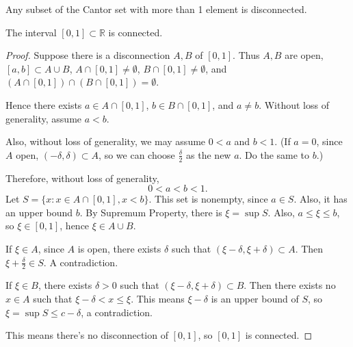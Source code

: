 \begin{example}
	Any subset of the Cantor set with more than 1 element is disconnected.
\end{example}

\begin{proposition}
	The interval $[0,1] \subset \mathbb{R}$ is connected.
\end{proposition}
\begin{proof}
	Suppose there is a disconnection $A, B$ of $[0,1]$. Thus $A, B$ are open, $[a,b] \subset A \cup B$, $A \cap [0,1] \neq  \emptyset $, $B \cap [0,1] \neq \emptyset $, and $(A \cap [0,1]) \cap (B \cap [0,1]) = \emptyset $.

	Hence there exists $a \in A \cap [0,1]$, $b \in B \cap [0,1]$, and $a \neq  b$. Without loss of generality, assume $a < b$. 

	Also, without loss of generality, we may assume  $0 < a$ and $b < 1$. (If $a = 0$, since $A$ open, $(-\delta, \delta) \subset A$, so we can choose $\frac{\delta}{2}$ as the new $a$. Do the same to $b$.)

	Therefore, without loss of generality, \[
		0 < a < b < 1
	.\] 
	Let $S = \{x: x \in A \cap [0,1], x < b\} $.
	This set is nonempty, since $a \in S$. Also, it has an upper bound $b$. By Supremum Property, there is $\xi = \operatorname{sup} S$.
	Also, $a \le \xi\le b$, so $\xi \in [0,1]$, hence $\xi \in A \cup B$.

	If $\xi \in A$, since $A$ is open, there exists $\delta$ such that $(\xi-\delta, \xi+\delta) \subset A$. Then $\xi + \frac{\delta}{2} \in S$. A contradiction.

	If $\xi \in B$, there exists $\delta > 0$ such that $(\xi-\delta, \xi+\delta) \subset B$. Then there exists no $x \in A$ such that $\xi - \delta < x \le \xi$. This means $\xi - \delta$ is an upper bound of $S$, so $\xi = \operatorname{sup} S \le  c- \delta$, a contradiction.

	This means there's no disconnection of  $[0,1]$, so $[0,1]$ is connected.
\end{proof}

